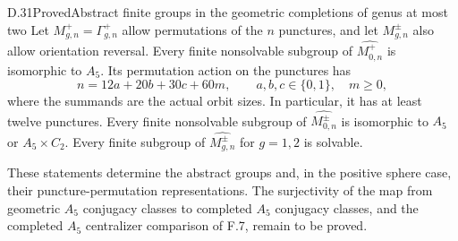 \begin{claim}{D.31}{Proved}{Abstract finite groups in the geometric completions of genus at most two}
Let $M_{g,n}^+=\Gamma^+_{g,n}$ allow permutations of the $n$
punctures, and let $M_{g,n}^{\pm}$ also allow orientation reversal.
Every finite nonsolvable subgroup of $\widehat{M_{0,n}^+}$ is
isomorphic to $A_5$. Its permutation action on the punctures has
\[
       n=12a+20b+30c+60m,\qquad
       a,b,c\in\{0,1\},\quad m\geq0,                 \tag{D.31.1}
\]
where the summands are the actual orbit sizes. In particular, it
has at least twelve punctures. Every finite nonsolvable subgroup
of $\widehat{M_{0,n}^{\pm}}$ is isomorphic to $A_5$ or
$A_5\times C_2$. Every finite subgroup of
$\widehat{M_{g,n}^{\pm}}$ for $g=1,2$ is solvable.

These statements determine the abstract groups and, in the positive
sphere case, their puncture-permutation representations. The
surjectivity of the map from geometric $A_5$ conjugacy classes to
completed $A_5$ conjugacy classes, and the completed $A_5$
centralizer comparison of F.7, remain to be proved.
\end{claim}
